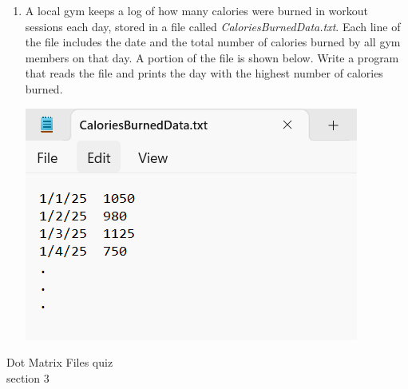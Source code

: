 \documentclass{article}
\begin{document}
\begin{enumerate}
	\item 
		A local gym keeps a log of how many calories were burned in workout sessions each day, stored in a file called \textit{CaloriesBurnedData.txt}.  
		Each line of the file includes the date and the total number of calories burned by all gym members on that day.  
		A portion of the file is shown below.  
		Write a program that reads the file and prints the day with the highest number of calories burned.
		
		\begin{flushright}
			\includegraphics[scale=.65]{imgs/CaloriesBurnedData.PNG}
		\end{flushright}


\end{enumerate}
\pagebreak
Dot Matrix \hfill Files quiz\\
section 3\\
\end{document}
